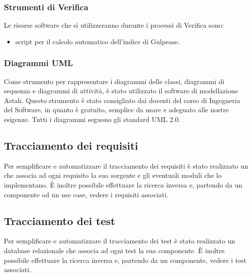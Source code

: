 \subsubsection{Strumenti di Verifica}
\label{}
Le risorse software che si utilizzeranno durante i processi di Verifica sono:
\begin{itemize}
\item {} script per il calcolo automatico dell'indice di Gulpease.
\end{itemize}

\subsubsection{Diagrammi UML}
Come strumento per rappresentare i diagrammi delle classi, diagrammi di sequenza e diagrammi di attività, è stato utilizzato il software di modellazione Astah. Questo strumento è stato consigliato dai docenti del corso di Ingegneria del Software, in quanto è gratuito, semplice da usare e adeguato alle nostre esigenze. Tutti i diagrammi seguono gli standard UML 2.0.

\subsection{Tracciamento dei requisiti}
\label{}
Per semplificare e automatizzare il tracciamento dei requisiti è stato realizzato un   che associa ad ogni requisito la sua sorgente e gli eventuali moduli che lo implementano. È inoltre possibile effettuare la ricerca inversa e, partendo da un componente od un use case, vedere i requisiti associati.

\subsection{Tracciamento dei test}
\label{}
Per semplificare e automatizzare il tracciamento dei test è stato realizzato un database relazionale che associa ad ogni test la sua componente. È inoltre possibile effettuare la ricerca inversa e, partendo da un componente, vedere i test associati.


\appendix

